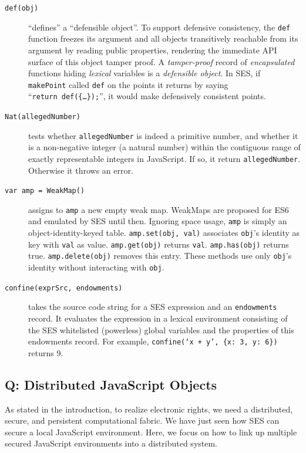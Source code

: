 \documentclass{llncs}
\begin{document}
\begin{description}
\item[{\tt def(obj)}]  ``defines'' a ``defensible object''. To support defensive consistency, the {\tt def} function freezes its argument and all objects transitively reachable from its argument by reading public properties, rendering the immediate API surface of this object tamper proof. A \emph{tamper-proof} record of \emph{encapsulated} functions hiding \emph{lexical} variables is a \emph{defensible object}. In SES, if {\tt makePoint} called {\tt def} on the points it returns by saying ``{\tt return~def(\{\ldots\});}'', it would make defensively consistent points.

\item[{\tt Nat(allegedNumber)}] tests whether {\tt allegedNumber} is indeed a primitive number, and whether it is a non-negative integer (a natural number) within the contiguous range of exactly representable integers in JavaScript. If so, it return {\tt allegedNumber}. Otherwise it throws an error.

\item[{\tt var amp = WeakMap()}] assigns to {\tt amp} a new empty weak map. WeakMaps are proposed for ES6 and emulated by SES until then. Ignoring space usage, {\tt amp} is simply an object-identity-keyed table. {\tt amp.set(obj, val)} associates {\tt obj}'s identity as key with {\tt val} as value. {\tt amp.get(obj)} returns {\tt val}. {\tt amp.has(obj)} returns true. {\tt amp.delete(obj)} removes this entry. These methods use only {\tt obj}'s identity without interacting with {\tt obj}.

\item[{\tt confine(exprSrc, endowments)}] takes the source code string for a SES expression and an {\tt endowments} record. It evaluates the expression in a lexical environment consisting of the SES whitelisted (powerless) global variables and the properties of this endowments record. For example, {\tt confine(`x~+~y',~\{x:~3,~y:~6\})} returns 9. 


\end{description}

\subsection{Q: Distributed JavaScript Objects}
\label{Q}

As stated in the introduction, to realize electronic rights, we need a distributed, secure, and persistent computational fabric. We have just seen how SES can secure a local JavaScript environment. Here, we focus on how to link up multiple secured JavaScript environments into a distributed system.
\end{document}
